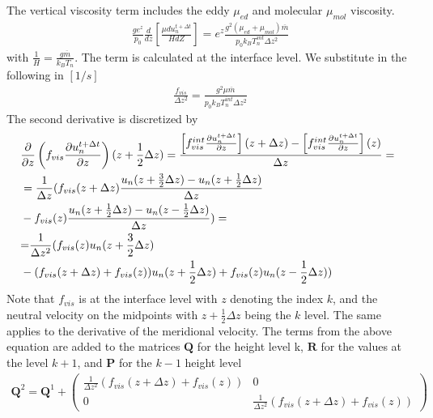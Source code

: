 The vertical viscosity term includes the eddy $\mu_{ed}$ and
molecular $\mu_{mol}$ viscosity.
%
\begin{align}
  \frac{g e^z}{p_0} \frac{d}{d z}\left[
       \frac{\mu d u_n^{t+\Delta t}}{H d Z}\right] = e^z \frac{g^2 (\mu_{ed} + \mu_{mol})
          \overline{m}}{p_0 k_B T_n^{int} \Delta z^2} 
\end{align}
%
with $\frac{1}{H} = \frac{g \overline{m}}{k_B T_n}$.   The term is calculated at the interface level. We substitute
in the following in $[1/s]$
%
\begin{align}
  \frac{f_{vis}}{\Delta z^2} = \frac{g^2 \mu \overline{m}}{p_0 k_B  T_n^{int} \Delta z^2}
\end{align}
%
The second derivative is discretized by
%
\begin{align}
  {}& \frac{\partial}{\partial z} \left(  {f_{vis}}
  \frac{\partial u_n^{t + \Delta t} }{\partial z}\right) (z+\frac{1}{2}\Delta z)  =
    \frac{ \left[ f^{int}_{vis} \frac{\partial u_n^{t + \Delta t} }
  {\partial z} \right](z+\Delta z)
  - \left[ f^{int}_{vis} \frac{\partial u_n^{t + \Delta t} }
  {\partial z} \right](z)}{\Delta
  z}  =& \notag \\
  {} & = \frac{1}{\Delta z} ( f_{vis}(z+\Delta z)
  \frac{u_n(z+\frac{3}{2}\Delta z)- u_n(z+\frac{1}{2}\Delta z)}{\Delta z}
   \notag \\
   {} \; \; & -  f_{vis}(z) \frac{u_n(z+\frac{1}{2}\Delta z)- u_n(z-\frac{1}{2}\Delta z)}
  {\Delta  z} ) =  \\
   {} & {=} \frac{1}{\Delta z^2} ( f_{vis}(z) u_n(z+\frac{3}{2}\Delta z) \notag \\
   {} \; \; & -
   (f_{vis}(z+\Delta z) + f_{vis}(z)) u_n(z+\frac{1}{2}\Delta z)
   + f_{vis}(z)u_n(z-\frac{1}{2}\Delta z)
   ) \label{eq:duv_2ndderiv} \notag
\end{align}
%
Note that $f_{vis}$ is at the interface level with $z$ denoting the
index $k$, and the neutral velocity on the midpoints with
$z+\frac{1}{2}\Delta z$ being the $k$ level. The same applies to the
derivative of the meridional velocity. The terms from the above
equation are added to the matrices $\mathbf{Q}$ for the height level
k, $\mathbf{R}$ for the values at the level $k+1$, and $\mathbf{P}$
for the $k-1$ height level
%
\begin{gather}
  \mathbf{Q}^2= \mathbf{Q}^1 +
   \begin{pmatrix}
       \frac{1}{ \Delta z^2}(f_{vis}(z+\Delta z) + f_{vis}(z))&  0\\
       0                   & \frac{1}{\Delta z^2}(f_{vis}(z+\Delta z) + f_{vis}(z))
   \end{pmatrix}
\end{gather}
